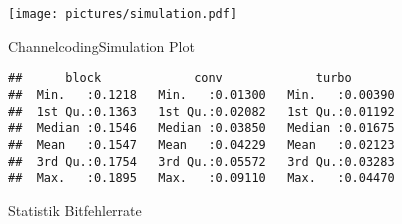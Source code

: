 \begin{figure}
\texttt{[image: pictures/simulation.pdf]}
\caption{ChannelcodingSimulation Plot}
\label{fig:simulation}
\end{figure}

\begin{figure}
\begin{verbatim}
##      block             conv             turbo        
##  Min.   :0.1218   Min.   :0.01300   Min.   :0.00390  
##  1st Qu.:0.1363   1st Qu.:0.02082   1st Qu.:0.01192  
##  Median :0.1546   Median :0.03850   Median :0.01675  
##  Mean   :0.1547   Mean   :0.04229   Mean   :0.02123  
##  3rd Qu.:0.1754   3rd Qu.:0.05572   3rd Qu.:0.03283  
##  Max.   :0.1895   Max.   :0.09110   Max.   :0.04470
\end{verbatim}
\caption{Statistik Bitfehlerrate}
\label{fig:stat}
\end{figure}
